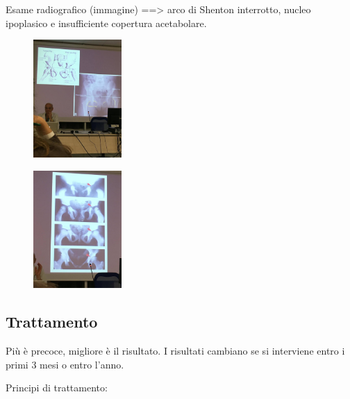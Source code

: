 Esame radiografico (immagine) ==\textgreater{} arco di Shenton interrotto, nucleo ipoplasico e insufficiente
copertura acetabolare.

\begin{figure}[!ht]
\centering
\includegraphics[width=0.3\textwidth]{018/image13.jpeg}
\end{figure}

\begin{figure}[!ht]
\centering
\includegraphics[width=0.3\textwidth]{018/image14.jpeg}
\end{figure}

\subsection{Trattamento}

Più è precoce, migliore è il risultato. I risultati cambiano se si interviene entro i primi 3 mesi o entro l'anno.

Principi di trattamento:

